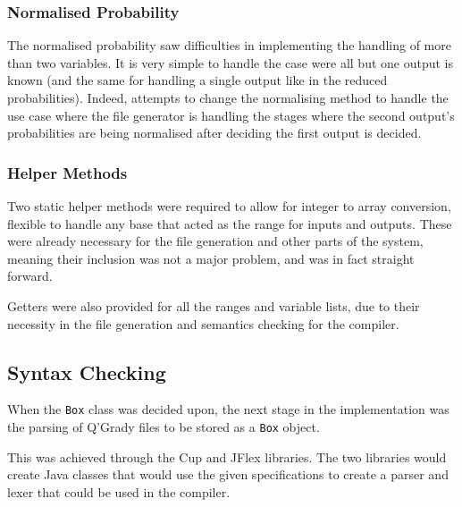 \documentclass[report.tex]{subfiles}
\begin{document}
\subsubsection{Normalised Probability} %
\label{ssub:normalised_probability}
The normalised probability saw difficulties in implementing the handling of more
than two variables. It is very simple to handle the case were all but one output
is known (and the same for handling a single output like in the reduced
probabilities). Indeed, attempts to change the normalising method to handle the
use case where the file generator is handling the stages where the second
output's probabilities are being normalised after deciding the first output is
decided.

 


\subsubsection{Helper Methods} %
\label{ssub:helper_methods}
Two static helper methods were required to allow for integer to array
conversion, flexible to handle any base that acted as the range for inputs and
outputs. These were already necessary for the file generation and other parts
of the system, meaning their inclusion was not a major problem, and was in fact
straight forward.

Getters were also provided for all the ranges and variable lists, due to their
necessity in the file generation and semantics checking for the compiler.

\subsection{Syntax Checking} %
\label{sub:syntax_checking}
When the \texttt{Box} class was decided upon, the next stage in the
implementation was the parsing of Q'Grady files to be stored as a \texttt{Box}
object.

This was achieved through the Cup and JFlex libraries. The two libraries would
create Java classes that would use the given specifications to create a parser
and lexer that could be used in the compiler.
\end{document}
